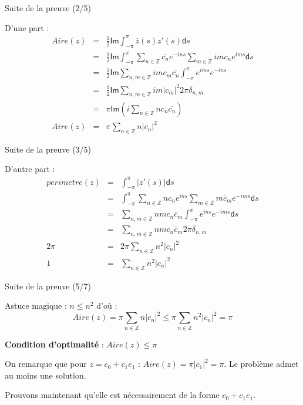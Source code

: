 \documentclass[11pt,envcountsect,aspectratio=169]{beamer} %
\newcommand{\Z}{\mathbb{Z}}
\renewcommand{\d}{\mathsf{d}}
\renewcommand{\Im}{\mathsf{Im}}
\renewcommand{\ss}{\vspace*{\baselineskip}}
\begin{document}
\begin{frame}{Suite de la preuve (2/5)}

    D'une part :
    \begin{eqnarray*}
    Aire(z) &=& \frac{1}{2} \Im \int_{-\pi}^{\pi}{\overline{z}(s) z'(s) \d s} \\
    &=& \frac{1}{2} \Im \int_{-\pi}^{\pi}{ \sum_{n\in \Z}{\overline{c_n} e^{-ins}} \sum_{m\in \Z}{imc_n e^{ims}}}\d s\\
    &=& \frac{1}{2} \Im \sum_{n,m\in \Z}{ im c_m \overline{c_n} \int_{-\pi}^{\pi}{e^{ims}e^{-ins}} } \\
    &=& \frac{1}{2} \Im \sum_{n,m\in \Z}{ im |c_m|^2 2\pi \delta_{n,m} } \\
    &=& \pi \Im\left( i\textstyle\sum_{n\in \Z}{ n c_n \overline{c_n}}\right) \\
    Aire(z) &=&  \pi\sum_{n\in\Z}n|c_n|^2
    \end{eqnarray*}

\end{frame}

\begin{frame}{Suite de la preuve (3/5)}

    D'autre part :
    \begin{eqnarray*}
    perimetre(z) &=& \int_{-\pi}^\pi |z'(s)|\d s \\
    &=& \int_{-\pi}^{\pi}{ \sum_{n \in \Z}{n c_n e^{ins}} \sum_{m \in \Z}{m \overline{c}_m e^{-ims}} \d s}\\
    &=& \sum_{n,m \in \Z}{ nm c_n \overline{c}_m \int_{-\pi}^{\pi}{ e^{ins} e^{-ims} \d s} } \\
    &=& \sum_{n,m \in \Z}{ nm c_n \overline{c}_m 2\pi \delta_{n,m} } \\
    2\pi &=& 2\pi \sum_{n\in\Z}n^2|c_n|^2 \\
    1 &=& \sum_{n\in\Z}n^2|c_n|^2
    \end{eqnarray*}
    
\end{frame}

\begin{frame}{Suite de la preuve (5/7)}

    Astuce magique : $n\leqslant n^2$ d'où :
    \[ Aire(z) = \pi \sum_{n\in \Z}{n|c_n|^2} \leqslant \pi \sum_{n\in \Z}{n^2|c_n|^2} = \pi\]
    \ss

    \textbf{Condition d'optimalité} : $Aire(z) \leqslant \pi$
    \ss
    
    On remarque que pour $z=c_0+c_1e_1$ : $Aire(z) = \pi |c_1|^2 = \pi$. Le problème admet au moins une solution.
    
    Prouvons maintenant qu'elle est nécessairement de la forme $c_0+c_1e_1$.
    
\end{frame}
\end{document}
